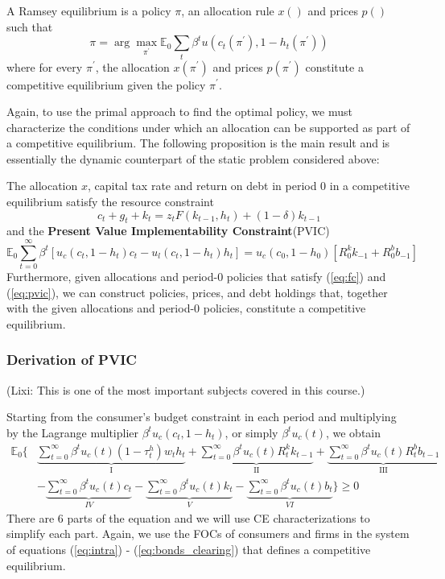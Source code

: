 \documentclass[12pt]{article}
\newcommand{\E}{\mathbb{E}}
\begin{document}
	\begin{definition}
		A Ramsey equilibrium is a policy $\pi$, an allocation rule $x()$ and prices $p()$ such that
		\begin{equation*}
			\pi = \arg \max_{\pi^{'}} \E_0 \sum_{t} \beta^t u(c_t(\pi^{'}), 1-h_t(\pi^{'}))
		\end{equation*}
		where for every $\pi^{'}$, the allocation $x(\pi^{'})$ and prices $p(\pi^{'})$ constitute a competitive equilibrium given the policy $\pi^{'}$. 
	\end{definition}

Again, to use the primal approach to find the optimal policy, we must characterize the conditions under which an allocation can be supported as part of a competitive equilibrium. The following proposition is the main result and is essentially the dynamic counterpart of the static problem considered above:
	
	\begin{proposition}
		The allocation $x$, capital tax rate and return on debt in period 0 in a competitive equilibrium satisfy the resource constraint
		\begin{equation}\label{eq:fc}
			c_t + g_t + k_t = z_t F(k_{t-1}, h_t) + (1-\delta)k_{t-1}
		\end{equation}
		and the \textbf{Present Value Implementability Constraint}(PVIC)
		\begin{equation}\label{eq:pvic}
			\E_0 \sum_{t=0}^\infty \beta^t[u_c(c_t, 1-h_t)c_t - u_l(c_t, 1-h_t)h_t] = u_c(c_0, 1-h_0)[R_0^k k_{-1} + R_0^b b_{-1}]
		\end{equation}
			Furthermore, given allocations and period-0 policies that satisfy (\ref{eq:fc}) and (\ref{eq:pvic}), we can construct policies, prices, and debt holdings that, together with the given allocations and period-0 policies, constitute a competitive equilibrium.
	\end{proposition}
	
	\subsubsection{Derivation of PVIC}
		(Lixi: This is one of the most important subjects covered in this course.) 
	
		Starting from the consumer's budget constraint in each period and multiplying by the Lagrange multiplier $\beta^t u_c(c_t, 1-h_t)$, or simply $\beta^tu_c(t)$, we obtain
	\begin{align*}
		\E_0 \Bigg\{ & \underbrace{\sum_{t=0}^\infty \beta^t u_c(t)(1-\tau_t^h) w_t h_t}_{\text{I}} + \underbrace{\sum_{t=0}^\infty \beta^t u_c(t) R_t^k k_{t-1}}_{\text{II}} + \underbrace{\sum_{t=0}^\infty \beta^t u_c(t) R_t^b b_{t-1}}_{\text{III}} \\ & - \underbrace{\sum_{t=0}^\infty \beta^t u_c(t) c_t}_{IV} - \underbrace{\sum_{t=0}^\infty \beta^t u_c(t) k_t}_{V} - \underbrace{ \sum_{t=0}^\infty \beta^t u_c(t) b_t}_{VI} \Bigg\} \geq 0
	\end{align*}
	There are 6 parts of the equation and we will use CE characterizations to simplify each part. Again, we use the FOCs of consumers and firms in the system of equations (\ref{eq:intra}) - (\ref{eq:bonds_clearing}) that defines a competitive equilibrium.
	
\end{document}
